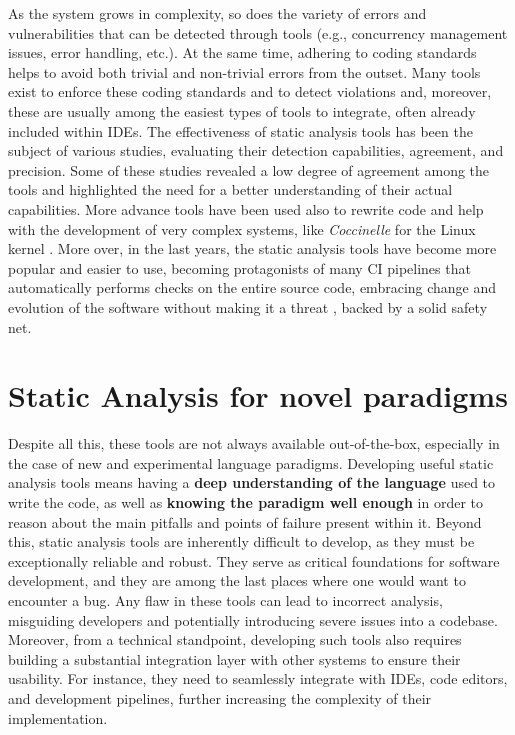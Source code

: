\documentclass[12pt,a4paper,openright,twoside]{book}
\begin{document}
As the system grows in complexity, so does the variety of errors and
vulnerabilities that can be detected through tools (e.g., concurrency management
issues, error handling, etc.). At the same time, adhering to coding standards
helps to avoid both trivial and non-trivial errors from the outset.
Many tools exist to enforce these coding standards and to detect violations and,
moreover, these are usually among the easiest types of tools to integrate, often
already included within \acp{IDE}.
%
The effectiveness of static analysis tools has been the subject of various
studies,  \cite{DBLP:journals/jss/LenarduzziPSLP23} evaluating their detection
capabilities, agreement, and precision. Some of these studies revealed a low
degree of agreement among the tools and highlighted the need for a better
understanding of their actual capabilities. More advance tools have been used
also to rewrite code and help with the development of very complex systems,
like \emph{Coccinelle} for the Linux kernel
\cite{DBLP:conf/eurosys/PadioleauLHM08}\cite{DBLP:conf/usenix/LawallM18}.
%
More over, in the last years, the static analysis tools have become more popular
and easier to use, becoming protagonists of many \ac{CI} pipelines
\cite{DBLP:conf/msr/ZampettiSOCP17} that automatically performs checks on the
entire source code, embracing change and evolution of the software without
making it a threat \cite{DBLP:books/daglib/0015650}, backed by a solid safety
net. 

\section{Static Analysis for novel paradigms}

Despite all this, these tools are not always available out-of-the-box,
especially in the case of new and experimental language paradigms. Developing
useful static analysis tools means having a \textbf{deep understanding of the
language} used to write the code, as well as \textbf{knowing the paradigm well
enough} in order to reason about the main pitfalls and points of failure present
within it.
%
Beyond this, static analysis tools are inherently difficult to develop, as they
must be exceptionally reliable and robust. They serve as critical foundations
for software development, and they are among the last places where one would
want to encounter a bug. Any flaw in these tools can lead to incorrect analysis,
misguiding developers and potentially introducing severe issues into a codebase.
%
Moreover, from a technical standpoint, developing such tools also requires
building a substantial integration layer with other systems to ensure their
usability. For instance, they need to seamlessly integrate with \acp{IDE}, code
editors, and development pipelines, further increasing the complexity of their
implementation.
\end{document}
